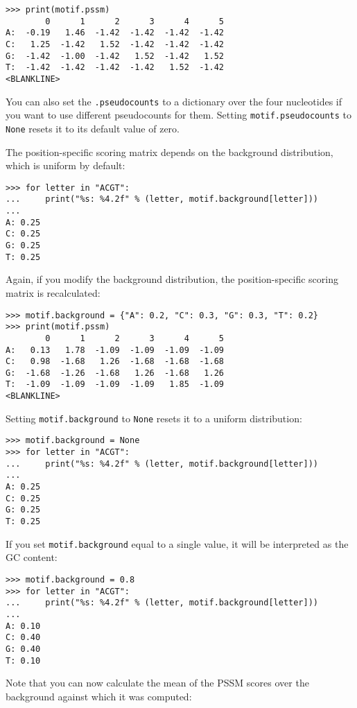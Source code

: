 \begin{verbatim}
>>> print(motif.pssm)
        0      1      2      3      4      5
A:  -0.19   1.46  -1.42  -1.42  -1.42  -1.42
C:   1.25  -1.42   1.52  -1.42  -1.42  -1.42
G:  -1.42  -1.00  -1.42   1.52  -1.42   1.52
T:  -1.42  -1.42  -1.42  -1.42   1.52  -1.42
<BLANKLINE>
\end{verbatim}
You can also set the \verb+.pseudocounts+ to a dictionary over the four nucleotides if you want to use different pseudocounts for them. Setting \verb+motif.pseudocounts+ to \verb+None+ resets it to its default value of zero.

The position-specific scoring matrix depends on the background distribution, which is uniform by default:

\begin{verbatim}
>>> for letter in "ACGT":
...     print("%s: %4.2f" % (letter, motif.background[letter]))
...
A: 0.25
C: 0.25
G: 0.25
T: 0.25
\end{verbatim}
Again, if you modify the background distribution, the position-specific scoring matrix is recalculated:

\begin{verbatim}
>>> motif.background = {"A": 0.2, "C": 0.3, "G": 0.3, "T": 0.2}
>>> print(motif.pssm)
        0      1      2      3      4      5
A:   0.13   1.78  -1.09  -1.09  -1.09  -1.09
C:   0.98  -1.68   1.26  -1.68  -1.68  -1.68
G:  -1.68  -1.26  -1.68   1.26  -1.68   1.26
T:  -1.09  -1.09  -1.09  -1.09   1.85  -1.09
<BLANKLINE>
\end{verbatim}
Setting \verb+motif.background+ to \verb+None+ resets it to a uniform distribution:

\begin{verbatim}
>>> motif.background = None
>>> for letter in "ACGT":
...     print("%s: %4.2f" % (letter, motif.background[letter]))
...
A: 0.25
C: 0.25
G: 0.25
T: 0.25
\end{verbatim}
If you set \verb+motif.background+ equal to a single value, it will be interpreted as the GC content:

\begin{verbatim}
>>> motif.background = 0.8
>>> for letter in "ACGT":
...     print("%s: %4.2f" % (letter, motif.background[letter]))
...
A: 0.10
C: 0.40
G: 0.40
T: 0.10
\end{verbatim}
Note that you can now calculate the mean of the PSSM scores over the background against which it was computed:

